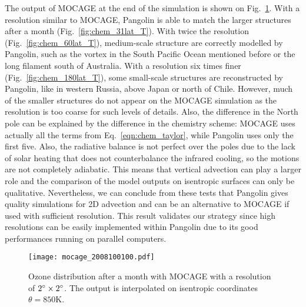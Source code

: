 The output of MOCAGE at the end of the simulation is shown on
Fig.~\ref{fig:mocage_T}. With a resolution similar to MOCAGE, Pangolin is able
to match the larger structures after a month (Fig.~\ref{fig:chem_31lat_T}). With
twice the resolution (Fig.~\ref{fig:chem_60lat_T}), medium-scale structure are
correctly modelled by Pangolin, such as the vortex in the South Pacific Ocean
mentioned before or the long filament south of Australia. With a resolution six
times finer (Fig.~\ref{fig:chem_180lat_T}), some small-scale structures are
reconstructed by Pangolin, like in western Russia, above Japan or north of
Chile. However, much of the smaller structures do not appear on the MOCAGE
simulation as the resolution is too coarse for such levels of details. Also, the
difference in the North pole can be explained
by the difference in the chemistry scheme: MOCAGE uses actually all the terms
from Eq.~\eqref{eqn:chem_taylor}, while Pangolin uses only the first five. Also,
the radiative balance is not perfect over the poles due to the lack of solar
heating that does not counterbalance the infrared cooling, so the motions are
not completely adiabatic. This means that vertical advection can play a larger
role and the comparison of the model outputs on isentropic surfaces can only be
qualitative. Nevertheless, we can conclude from these tests that Pangolin gives
quality simulations for 2D advection and can be an alternative to MOCAGE if used
with sufficient resolution.  This result validates our strategy since high
resolutions can be easily implemented within Pangolin due to its good
performances running on parallel computers. 

\begin{figure}
\texttt{[image: mocage\_2008100100.pdf]}
\caption{Ozone distribution after a month with MOCAGE with a resolution of
  $2^{\circ}\times2^{\circ}$. The output is interpolated on isentropic coordinates
$\theta=850$K.}
\label{fig:mocage_T}
\end{figure}

